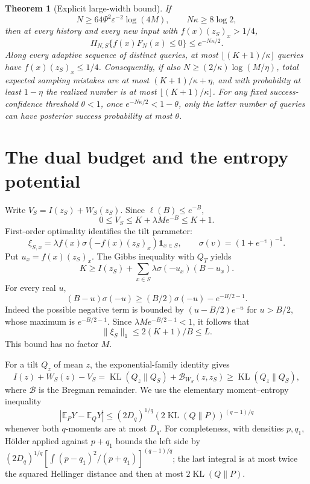 \documentclass[11pt]{article}
\newtheorem{theorem}{Theorem}
\newcommand{\KL}{\operatorname{KL}}
\newcommand{\E}{\mathbb E}
\newcommand{\ellg}{\ell}
\begin{document}
\begin{theorem}[Explicit large-width bound]
If
\[
 N\ge64\Psi^2\varepsilon^{-2}\log(4M),\qquad
 N\kappa\ge8\log2,
\]
then at every history and every new input with $f(x)(z_S)_x>1/4$,
\[
       \Pi_{N,S}\{f(x)F_N(x)\le0\}\le e^{-N\kappa/2}.          \tag{3}
\]
Along every adaptive sequence of distinct queries, at most
$\lfloor(K+1)/\kappa\rfloor$ queries have $f(x)(z_S)_x\le1/4$.
Consequently, if also $N\ge(2/\kappa)\log(M/\eta)$, total expected
sampling mistakes are at most $(K+1)/\kappa+\eta$, and with probability
at least $1-\eta$ the realized number is at most
$\lfloor(K+1)/\kappa\rfloor$. For any fixed success-confidence
threshold $\theta<1$, once $e^{-N\kappa/2}<1-\theta$, only the latter
number of queries can have posterior success probability at most $\theta$.
\end{theorem}

\section{The dual budget and the entropy potential}
Write $V_S=I(z_S)+W_S(z_S)$. Since $\ellg(B)\le e^{-B}$,
\[
                  0\le V_S\le K+\lambda M e^{-B}\le K+1.      \tag{4}
\]
First-order optimality identifies the tilt parameter:
\[
 \xi_{S,x}=\lambda f(x)\sigma(-f(x)(z_S)_x)\mathbf1_{x\in S},
 \qquad \sigma(v)=(1+e^{-v})^{-1}.
\]
Put $u_x=f(x)(z_S)_x$. The Gibbs inequality with $Q_T$ yields
\[
 K\ge I(z_S)+\sum_{x\in S}\lambda\sigma(-u_x)(B-u_x).
\]
For every real $u$,
\[
 (B-u)\sigma(-u)\ge (B/2)\sigma(-u)-e^{-B/2-1}.
\]
Indeed the possible negative term is bounded by
$(u-B/2)e^{-u}$ for $u>B/2$, whose maximum is $e^{-B/2-1}$.
Since $\lambda M e^{-B/2-1}<1$, it follows that
\[
                         \|\xi_S\|_1\le2(K+1)/B\le L.        \tag{5}
\]
This bound has no factor $M$.

For a tilt $Q_z$ of mean $z$, the exponential-family identity gives
\[
 I(z)+W_S(z)-V_S
 =\KL(Q_z\|Q_S)+\mathcal B_{W_S}(z,z_S)
 \ge\KL(Q_z\|Q_S),                                        \tag{6}
\]
where $\mathcal B$ is the Bregman remainder. We use the elementary
moment--entropy inequality
\[
 |\E_P Y-\E_Q Y|\le (2D_q)^{1/q}
                    (2\KL(Q\|P))^{(q-1)/q}                 \tag{7}
\]
whenever both $q$-moments are at most $D_q$.
For completeness, with densities $p,q_1$, H\"older applied against
$p+q_1$ bounds the left side by
$(2D_q)^{1/q}[\int (p-q_1)^2/(p+q_1)]^{(q-1)/q}$;
the last integral is at most twice the squared Hellinger distance and
then at most $2\KL(Q\|P)$.
\end{document}
